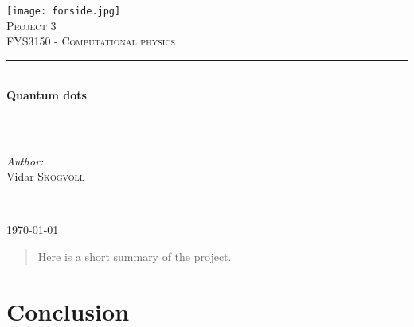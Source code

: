 \documentclass[a4paper,10pt,english]{article}
\numberwithin{figure}{subsection}
\numberwithin{table}{subsection}
\numberwithin{equation}{subsection}
\newcommand{\HRule}{\rule{\linewidth}{0.5mm}}
\begin{document}
\pagestyle{fancy}
\renewcommand{\sectionmark}[1]{\markright{#1}{}}

\pagestyle{fancy}
\renewcommand{\sectionmark}[1]{\markright{\thesection\ #1}}

\fancyhf{}
\lhead{\fancyplain{}{\rightmark }} %
\cfoot{\fancyplain{}{\thepage}}


\begin{titlepage}
\begin{center}

\texttt{[image: forside.jpg]}~\\[1cm]

\textsc{\LARGE Project 3}\\[1.5cm]

\textsc{\Large FYS3150 - Computational physics}\\[0.5cm]

\HRule \\[0.4cm]
{ \huge \bfseries Quantum dots \\[0.4cm] }

\HRule \\[1.5cm]

\begin{minipage}{0.4\textwidth}
\begin{flushleft} \large
\emph{Author:}\\
Vidar \textsc{Skogvoll}
\end{flushleft}
\end{minipage}
\begin{minipage}{0.4\textwidth}
\begin{flushright} \large
\emph{ } \\
 \textsc{ }
\end{flushright}
\end{minipage}

\vfill

{\large \today}

\end{center}
\end{titlepage}
\setcounter{page}{2}

\begin{abstract}
Here is a short summary of the project.
\end{abstract}

\hypersetup{linkcolor=black}
\tableofcontents 
\hypersetup{linkcolor=red}
\clearpage








\section{Conclusion}

\clearpage
{}

\end{document}
